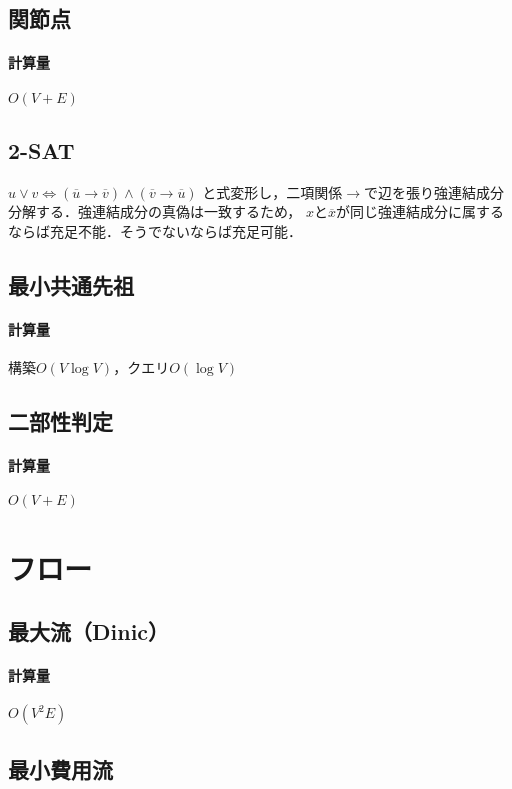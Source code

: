 \documentclass[landscape,twocolumn,9pt]{jsarticle}
\begin{document}
\subsection{関節点}
\paragraph{計算量} $O(V+E)$


\subsection{2-SAT}
$u\lor v \Leftrightarrow(\overline u\to\overline v)\land(\overline v\to\overline u)$
と式変形し，二項関係$\to$で辺を張り強連結成分分解する．強連結成分の真偽は一致するため，
$x$と$\overline x$が同じ強連結成分に属するならば充足不能．そうでないならば充足可能．

\subsection{最小共通先祖}
\paragraph{計算量} 構築$O(V \log V)$，クエリ$O(\log V)$


\subsection{二部性判定}
\paragraph{計算量} $O(V+E)$


\section{フロー}%
\subsection{最大流（Dinic）}
\paragraph{計算量} $O(V^2E)$


\subsection{最小費用流}
\end{document}
